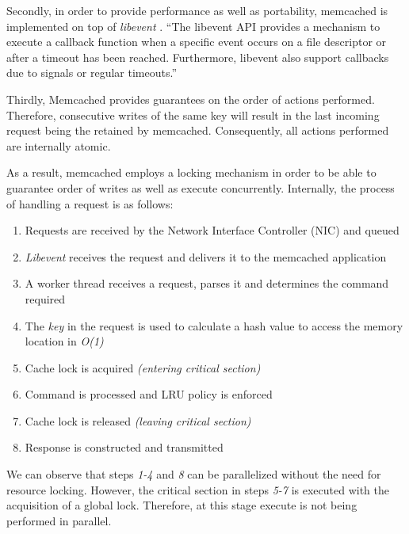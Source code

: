 Secondly, in order to provide performance as well as  portability, memcached is implemented on top of \textit{libevent} \cite{libevent}. ``The libevent API provides a mechanism to execute a callback function when a specific event occurs on a file descriptor or after a timeout has been reached. Furthermore, libevent also support callbacks due to signals or regular timeouts.'' \cite{libevent}

Thirdly, Memcached provides guarantees on the order of actions performed. Therefore, consecutive writes of the same key will result in the last incoming request being the retained by memcached. Consequently, all actions performed are internally atomic.

As a result, memcached employs a locking mechanism in order to be able to guarantee order of writes as well as execute concurrently. Internally, the process of handling a request is as follows:

\begin{enumerate}
    \item Requests are received by the Network Interface Controller (NIC) and queued
    \item \emph{Libevent} receives the request and delivers it to the memcached application
    \item A worker thread receives a request, parses it and determines the command required
    \item The \emph{key} in the request is used to calculate a hash value to access the memory location in \emph{O(1)}
    \item Cache lock is acquired \emph{(entering critical section)}
    \item Command is processed and LRU policy is enforced
    \item Cache lock is released \emph{(leaving critical section)}
    \item Response is constructed and transmitted \cite{wiggins2012enhancing}
\end{enumerate}

We can observe that steps \textit{1-4} and \textit{8} can be parallelized without the need for resource locking. However, the critical section in steps \textit{5-7} is executed with the acquisition of a global lock. Therefore, at this stage execute is not being performed in parallel.

